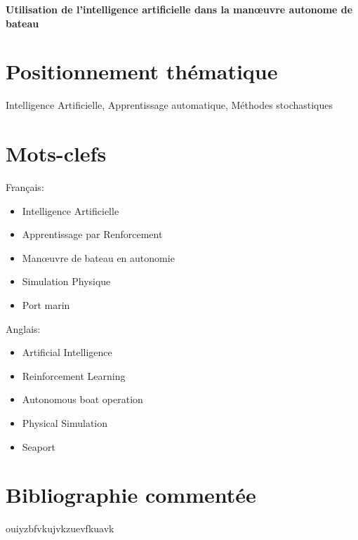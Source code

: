 \documentclass[12pt,a4paper]{extarticle}
\begin{document}
\begin{center}

\huge{ \bfseries Utilisation de l'intelligence artificielle dans la manœuvre autonome de bateau}
\end{center}

\section*{Positionnement thématique}

Intelligence Artificielle, Apprentissage automatique, Méthodes stochastiques

\section*{Mots-clefs}

\begin{multicols}{2}

Français:

\begin{itemize}

\item Intelligence Artificielle
\item Apprentissage par Renforcement
\item Manœuvre de bateau en autonomie
\item Simulation Physique
\item Port marin

\end{itemize}

Anglais:

\begin{itemize}

\item Artificial Intelligence
\item Reinforcement Learning
\item Autonomous boat operation
\item Physical Simulation
\item Seaport

\end{itemize}

\end{multicols}

\section*{Bibliographie commentée}

\indent ouiyzbfvkujvkzuevfkuavk \textcite{3b1b}
\end{document}
